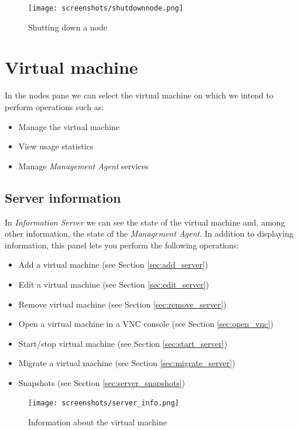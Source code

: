 \begin{figure}[H]
        \begin{center}
        \texttt{[image: screenshots/shutdownnode.png]}
        \caption{Shutting down a node}
        \label{fig:storage_lv_ctx}
        \end{center}
\end{figure}


\pagebreak

\section{Virtual machine}
\label{sec:server}
In the nodes pane we can select the virtual machine on which we intend to perform operations such as:

\begin{itemize}
        \item Manage the virtual machine
        \item View usage statistics 
        \item Manage \emph{Management Agent} services
\end{itemize}

\subsection{Server information}
In \emph{Information Server} we can see the state of the virtual machine and, among other information, the state of the \emph{Management Agent}.
In addition to displaying information, this panel lets you perform the following operations:

\begin{itemize}
	\item Add a virtual machine (see Section \ref{sec:add_server})
    \item Edit a virtual machine (see Section \ref{sec:edit_server})
	\item Remove virtual machine (see Section \ref{sec:remove_server})
	\item Open a virtual machine in a VNC console (see Section \ref{sec:open_vnc})
	\item Start/stop virtual machine (see Section \ref{sec:start_server})
    \item Migrate a virtual machine (see Section \ref{sec:migrate_server})
    \item Snapshots (see Section \ref{sec:server_snapshots})
\end{itemize}

\begin{figure}[H]
	\begin{center}
	\texttt{[image: screenshots/server\_info.png]}
	\caption{Information about the virtual machine}
	\label{fig:server_info}
	\end{center}
\end{figure}

